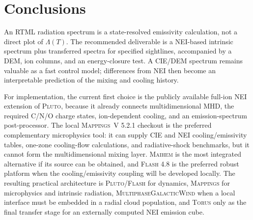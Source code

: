 \documentclass[english,a4paper]{my_memo2}
\begin{document}
\section{Conclusions}

An RTML radiation spectrum is a state-resolved emissivity calculation,
not a direct plot of $\Lambda(T)$.  The recommended deliverable is a
NEI-based intrinsic spectrum plus transferred spectra for specified sightlines,
accompanied by a DEM, ion columns, and an energy-closure test.  A CIE/DEM
spectrum remains valuable as a fast control model; differences from NEI then
become an interpretable prediction of the mixing and cooling history.

For implementation, the current first choice is the publicly available
full-ion NEI extension of \textsc{Pluto}, because it already connects
multidimensional MHD, the required C/N/O charge states, ion-dependent cooling,
and an emission-spectrum post-processor.  The local \textsc{Mappings~V} 5.2.1
checkout is the preferred complementary microphysics tool: it can supply CIE
and NEI cooling/emissivity tables, one-zone cooling-flow calculations, and
radiative-shock benchmarks, but it cannot form the multidimensional mixing
layer.  \textsc{Maihem} is the most integrated alternative if its source can
be obtained, and \textsc{Flash} 4.8 is the preferred robust platform when the
cooling/emissivity coupling will be developed locally.  The resulting
practical architecture is \textsc{Pluto}/\textsc{Flash} for dynamics,
\textsc{Mappings} for microphysics and intrinsic radiation,
\textsc{MultiphaseGalacticWind} when a local interface must be embedded in a
radial cloud population, and \textsc{Torus} only as the final transfer stage
for an externally computed NEI emission cube.
\end{document}
